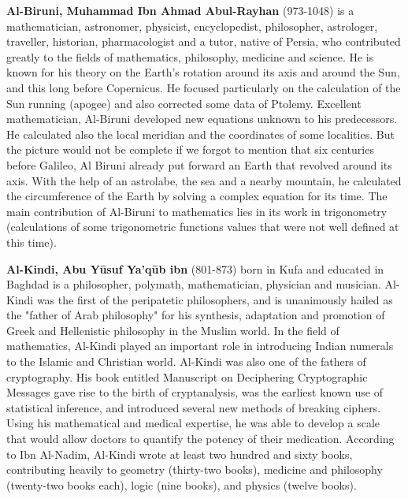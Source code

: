 \pichskip{15pt}%
\textbf{Al-Biruni, Muhammad Ibn Ahmad Abul-Rayhan} (973-1048) is a mathematician, astronomer, physicist, encyclopedist, philosopher, astrologer, traveller, historian, pharmacologist and a tutor, native of Persia, who contributed greatly to the fields of mathematics, philosophy, medicine and science. He is known for his theory on the Earth's rotation around its axis and around the Sun, and this long before Copernicus. He focused particularly on the calculation of the Sun running (apogee) and also corrected some data of Ptolemy. Excellent mathematician, Al-Biruni developed new equations unknown to his predecessors. He calculated also the local meridian and the coordinates of some localities. But the picture would not be complete if we forgot to mention that six centuries before Galileo, Al Biruni already put forward an Earth that revolved around its axis. With the help of an astrolabe, the sea and a nearby mountain, he calculated the circumference of the Earth by solving a complex equation for its time. The main contribution of Al-Biruni to mathematics lies in its work in trigonometry (calculations of some trigonometric functions values that were not well defined at this time).

\pichskip{15pt}%
\textbf{Al-Kindi, Abu Yūsuf Ya'qūb ibn} (801-873)  born in Kufa and educated in Baghdad is a philosopher, polymath, mathematician, physician and musician. Al-Kindi was the first of the  peripatetic philosophers, and is unanimously hailed as the "father of Arab philosophy" for his synthesis, adaptation and promotion of Greek and Hellenistic philosophy in the Muslim world. In the field of mathematics, Al-Kindi played an important role in introducing Indian numerals to the Islamic and Christian world. Al-Kindi was also one of the fathers of cryptography. His book entitled Manuscript on Deciphering Cryptographic Messages gave rise to the birth of cryptanalysis, was the earliest known use of statistical inference, and introduced several new methods of breaking ciphers. Using his mathematical and medical expertise, he was able to develop a scale that would allow doctors to quantify the potency of their medication. According to Ibn Al-Nadim, Al-Kindi wrote at least two hundred and sixty books, contributing heavily to geometry (thirty-two books), medicine and philosophy (twenty-two books each), logic (nine books), and physics (twelve books).

